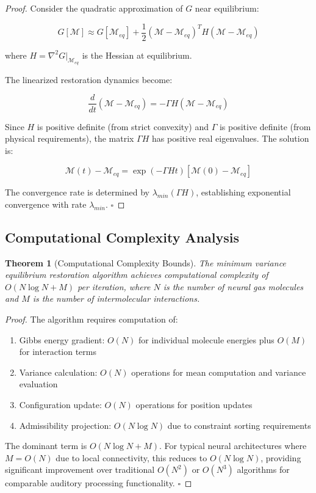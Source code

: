 \documentclass[12pt,a4paper]{article}
\newtheorem{theorem}{Theorem}[section]
\begin{document}
\begin{proof}
Consider the quadratic approximation of $G$ near equilibrium:

\begin{equation}
G[\mathcal{M}] \approx G[\mathcal{M}_{eq}] + \frac{1}{2} (\mathcal{M} - \mathcal{M}_{eq})^T H (\mathcal{M} - \mathcal{M}_{eq})
\end{equation}

where $H = \nabla^2 G|_{\mathcal{M}_{eq}}$ is the Hessian at equilibrium.

The linearized restoration dynamics become:

\begin{equation}
\frac{d}{dt}(\mathcal{M} - \mathcal{M}_{eq}) = -\Gamma H (\mathcal{M} - \mathcal{M}_{eq})
\end{equation}

Since $H$ is positive definite (from strict convexity) and $\Gamma$ is positive definite (from physical requirements), the matrix $\Gamma H$ has positive real eigenvalues. The solution is:

\begin{equation}
\mathcal{M}(t) - \mathcal{M}_{eq} = \exp(-\Gamma H t) [\mathcal{M}(0) - \mathcal{M}_{eq}]
\end{equation}

The convergence rate is determined by $\lambda_{min}(\Gamma H)$, establishing exponential convergence with rate $\lambda_{min}$. $\square$
\end{proof}

\subsection{Computational Complexity Analysis}

\begin{theorem}[Computational Complexity Bounds]
The minimum variance equilibrium restoration algorithm achieves computational complexity of $O(N \log N + M)$ per iteration, where $N$ is the number of neural gas molecules and $M$ is the number of intermolecular interactions.
\end{theorem}

\begin{proof}
The algorithm requires computation of:
\begin{enumerate}
\item Gibbs energy gradient: $O(N)$ for individual molecule energies plus $O(M)$ for interaction terms
\item Variance calculation: $O(N)$ operations for mean computation and variance evaluation
\item Configuration update: $O(N)$ operations for position updates
\item Admissibility projection: $O(N \log N)$ due to constraint sorting requirements
\end{enumerate}

The dominant term is $O(N \log N + M)$. For typical neural architectures where $M = O(N)$ due to local connectivity, this reduces to $O(N \log N)$, providing significant improvement over traditional $O(N^2)$ or $O(N^3)$ algorithms for comparable auditory processing functionality. $\square$
\end{proof}
\end{document}
